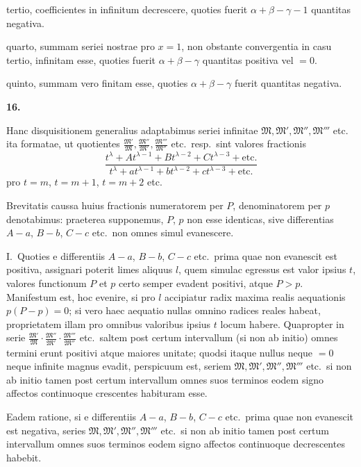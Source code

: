 \documentclass[12pt,a4paper]{article}
\newcommand{\art}[1]{\par\medskip\noindent\textbf{#1.}\par\nopagebreak\smallskip}
\begin{document}
tertio, coefficientes in infinitum decrescere, quoties fuerit $\alpha+\beta-\gamma-1$ quantitas negativa.

quarto, summam seriei nostrae pro $x=1$, non obstante convergentia in casu tertio, infinitam esse, quoties fuerit $\alpha+\beta-\gamma$ quantitas positiva vel $=0$.

quinto, summam vero finitam esse, quoties $\alpha+\beta-\gamma$ fuerit quantitas negativa.

\art{16}

Hanc disquisitionem generalius adaptabimus seriei infinitae $\mathfrak{M}, \mathfrak{M}', \mathfrak{M}'', \mathfrak{M}'''$ etc.
ita formatae, ut quotientes $\frac{\mathfrak{M}'}{\mathfrak{M}}, \frac{\mathfrak{M}''}{\mathfrak{M}'}, \frac{\mathfrak{M}'''}{\mathfrak{M}''}$ etc.\ resp.\ sint valores fractionis
\[
\frac{t^{\lambda} + At^{\lambda-1} + Bt^{\lambda-2} + Ct^{\lambda-3} + \text{etc.}}{t^{\lambda} + at^{\lambda-1} + bt^{\lambda-2} + ct^{\lambda-3} + \text{etc.}}
\]
pro $t=m$, $t=m+1$, $t=m+2$ etc.

Brevitatis caussa huius fractionis numeratorem per $P$, denominatorem per $p$ denotabimus: praeterea supponemus, $P$, $p$ non esse identicas, sive differentias $A-a$, $B-b$, $C-c$ etc.\ non omnes simul evanescere.

I.\ Quoties e differentiis $A-a$, $B-b$, $C-c$ etc.\ prima quae non evanescit est positiva, assignari poterit limes aliquus $l$, quem simulac egressus est valor ipsius $t$, valores functionum $P$ et $p$ certo semper evadent positivi, atque $P>p$. Manifestum est, hoc evenire, si pro $l$ accipiatur radix maxima realis aequationis $p(P-p)=0$; si vero haec aequatio nullas omnino radices reales habeat, proprietatem illam pro omnibus valoribus ipsius $t$ locum habere. Quapropter in serie $\frac{\mathfrak{M}'}{\mathfrak{M}}\cdot\frac{\mathfrak{M}''}{\mathfrak{M}'}\cdot\frac{\mathfrak{M}'''}{\mathfrak{M}''}$ etc.\ saltem post certum intervallum (si non ab initio) omnes termini erunt positivi atque maiores unitate; quodsi itaque nullus neque $=0$ neque infinite magnus evadit, perspicuum est, seriem $\mathfrak{M}, \mathfrak{M}', \mathfrak{M}'', \mathfrak{M}'''$ etc.\ si non ab initio tamen post certum intervallum omnes suos terminos eodem signo affectos continuoque crescentes habituram esse.

Eadem ratione, si e differentiis $A-a$, $B-b$, $C-c$ etc.\ prima quae non evanescit est negativa, series $\mathfrak{M}, \mathfrak{M}', \mathfrak{M}'', \mathfrak{M}'''$ etc.\ si non ab initio tamen post certum intervallum omnes suos terminos eodem signo affectos continuoque decrescentes habebit.
\end{document}
